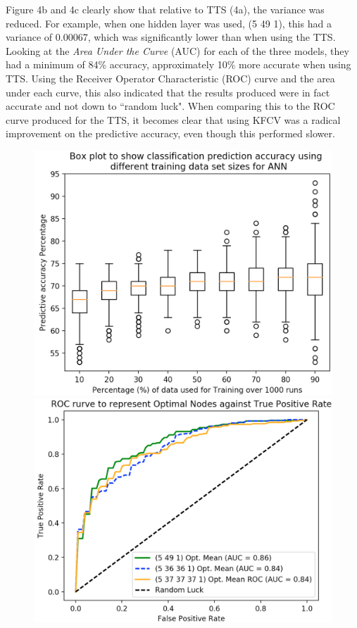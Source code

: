 \documentclass[11pt]{article}
\begin{document}
Figure 4b and 4c clearly show that relative to TTS (4a), the variance was reduced. For example, when one hidden layer was used, (5 49 1), this had a variance of 0.00067, which was significantly lower than when using the TTS. Looking at the \textit{Area Under the Curve} (AUC) for each of the three models, they had a minimum of 84\% accuracy, approximately 10\% more accurate when using TTS. Using the Receiver Operator Characteristic (ROC) curve and the area under each curve, this also indicated that the results produced were in fact accurate and not down to ``random luck". When comparing this to the ROC curve produced for the TTS, it becomes clear that using KFCV was a radical improvement on the predictive accuracy, even though this performed slower. 
\begin{figure}[h]
\centering
\includegraphics[scale = .40]{optTTS}
\includegraphics[scale = .40]{roc1}

\end{figure}
\end{document}
